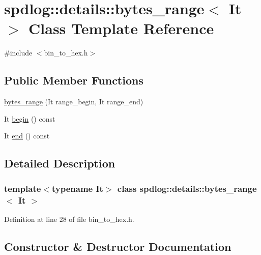 \hypertarget{classspdlog_1_1details_1_1bytes__range}{}\section{spdlog\+:\+:details\+:\+:bytes\+\_\+range$<$ It $>$ Class Template Reference}
\label{classspdlog_1_1details_1_1bytes__range}


{\ttfamily \#include $<$bin\+\_\+to\+\_\+hex.\+h$>$}

\subsection*{Public Member Functions}
\begin{DoxyCompactItemize}
\item 
\hyperlink{classspdlog_1_1details_1_1bytes__range_aa623616735396b0422737b9b62bdd46e}{bytes\+\_\+range} (It range\+\_\+begin, It range\+\_\+end)
\item 
It \hyperlink{classspdlog_1_1details_1_1bytes__range_abe7813dcd59c848fd56b0c33e5bbc134}{begin} () const
\item 
It \hyperlink{classspdlog_1_1details_1_1bytes__range_a513faba7dd574f7a32f00504739d6032}{end} () const
\end{DoxyCompactItemize}


\subsection{Detailed Description}
\subsubsection*{template$<$typename It$>$\newline
class spdlog\+::details\+::bytes\+\_\+range$<$ It $>$}



Definition at line 28 of file bin\+\_\+to\+\_\+hex.\+h.



\subsection{Constructor \& Destructor Documentation}
\mbox{\label{classspdlog_1_1details_1_1bytes__range_aa623616735396b0422737b9b62bdd46e}} 
